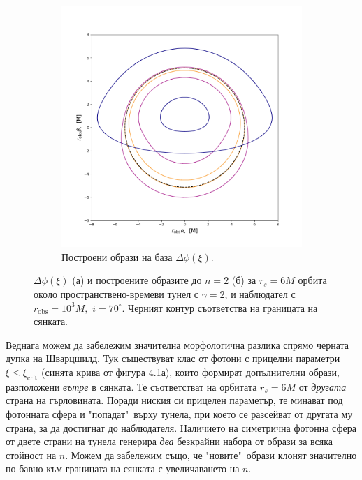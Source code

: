 \documentclass[12pt]{article}
\numberwithin{equation}{section}
\numberwithin{figure}{section}
\begin{document}
\begin{figure}[h]
\begin{subfigure}{6cm}
			\includegraphics[scale = 0.3]{Section_6_Morphology_of_the images_of_horizonless_spacetimes/WH_70_deg_r6_gamma_2.png}
			\caption{Построени образи на база $\Delta\phi(\xi)$.\newline} \label{fig:1b}
		\end{subfigure}
		\caption[$\Delta\phi(\xi)$ и образите за $r_s=6M$ орбита около пространствено-времеви тунел до $n = 2$.]{\small $\Delta\phi(\xi)$ (а) и построените образите до $n = 2$ (б) за $r_s=6M$ орбита около пространствено-времеви тунел с $\gamma = 2$, и наблюдател с $r_\text{obs} = 10^3M,\,\,i = 70^\circ$. Черният контур съответства на границата на сянката.} 
		\label{WH_r6_orbit}
	\end{figure}
	
	\lfoot{}
	Веднага можем да забележим значителна морфологична разлика спрямо черната дупка на Шварцшилд. Тук съществуват клас от фотони с прицелни параметри $\xi \le \xi_\text{crit}$ (синята крива от фигура 4.1а), които формират допълнителни образи, разположени \emph{вътре} в сянката. Те съответстват на орбитата $r_s = 6M$ от \emph{другата} страна на гърловината. Поради ниския си прицелен параметър, те минават под фотонната сфера и "попадат"$\,$ върху тунела, при което се разсейват от другата му страна, за да достигнат до наблюдателя. Наличието на симетрична фотонна сфера от двете страни на тунела генерира \emph{два} безкрайни набора от образи за всяка стойност на $n$. Можем да забележим също, че "новите"$\,$ образи клонят значително по-бавно към границата на сянката с увеличаването на $n$.\\
	
\end{document}
